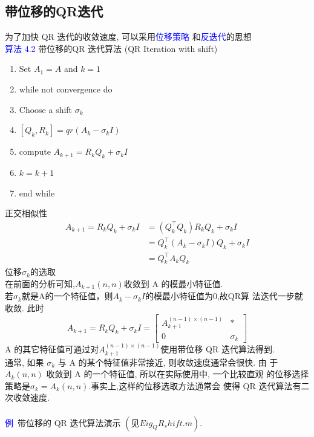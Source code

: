 \documentclass[12pt,a4paper]{article}
\begin{document}
\subsection{带位移的QR迭代}
为了加快 QR 迭代的收敛速度, 可以采用\textcolor{blue}{位移策略} 和\textcolor{blue}{反迭代}的思想\\
\textcolor{blue}{算法 4.2} 带位移的QR 迭代算法 (QR Iteration with shift)\\
\begin{enumerate}[1:]
\item Set $A_{1}=A$ and $k=1$
\item while not convergence do
\item Choose a shift $\sigma_{k}$
\item \qquad $[Q_{k},R_{k}]=qr(A_{k}-\sigma_{k}I)$
\item \qquad compute $A_{k+1}=R_{k}Q_{k}+\sigma_{k}I$
\item \qquad$k=k+1$
\item end while
\end{enumerate}
正交相似性\\
$$
\begin{aligned} A_{k+1}=R_{k} Q_{k}+\sigma_{k} I &=\left(Q_{k}^{\top} Q_{k}\right) R_{k} Q_{k}+\sigma_{k} I \\ &=Q_{k}^{\top}\left(A_{k}-\sigma_{k} I\right) Q_{k}+\sigma_{k} I \\ &=Q_{k}^{\top} A_{k} Q_{k} \end{aligned}
$$
位移$\sigma_{k}$的选取\\
在前面的分析可知,$A_{k+1}(n, n)$收敛到 A 的模最小特征值.\\
若$\sigma_{k}$就是A的一个特征值，则$A_{k}-\sigma_{k} I$的模最小特征值为0,故QR算 法迭代一步就收敛. 此时
$$
A_{k+1}=R_{k} Q_{k}+\sigma_{k} I=\left[\begin{array}{cc}
{A_{k+1}^{(n-1) \times(n-1)}} & {*} \\
 {0} & {\sigma_{k}}
 \end{array}\right]
$$
A 的其它特征值可通过对$A_{k+1}^{(n-1) \times(n-1)}$使用带位移 QR 迭代算法得到.\\
通常, 如果 $\sigma_{k}$ 与 A 的某个特征值非常接近, 则收敛速度通常会很快. 由 于 $A_{k} (n, n)$ 收敛到 A 的一个特征值, 所以在实际使用中, 一个比较直观 的位移选择策略是$\sigma_{k} =A_{k}(n,n)$.事实上,这样的位移选取方法通常会 使得 QR 迭代算法有二次收敛速度.\\
\\
\textcolor{blue}{例}~带位移的 QR 迭代算法演示 $(见 Eig_QR_shift.m).$\\
\end{document}
